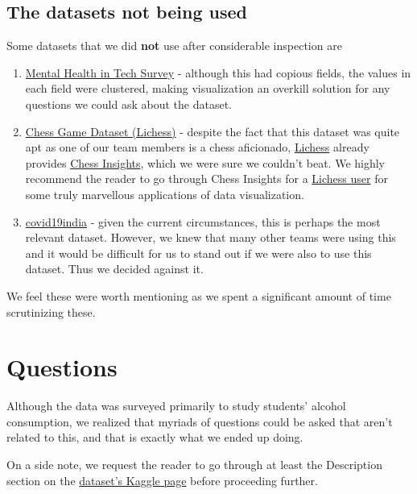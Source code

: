 \documentclass[titlepage, 12pt]{article}
\begin{document}
\subsection{The datasets not being used}
Some datasets that we did \textbf{not} use after considerable inspection are
\begin{enumerate}

    \item\href{https://www.kaggle.com/osmi/mental-health-in-tech-survey}{Mental
        Health in Tech Survey} - although this had copious fields, the values in
        each field were clustered, making visualization an overkill solution for
        any questions we could ask about the dataset.

    \item\href{https://www.kaggle.com/datasnaek/chess}{Chess Game Dataset
        (Lichess)} - despite the fact that this dataset was quite apt as one of
        our team members is a chess aficionado,
        \href{https://lichess.org/}{Lichess} already provides
        \href{https://lichess.org/blog/VmZbaigAABACtXQC/chess-insights}{Chess
        Insights}, which we were sure we couldn't beat. We highly recommend the
        reader to go through Chess Insights for a
        \href{https://lichess.org/insights/The_Mockingbird/acpl/variant}{Lichess
        user} for some truly marvellous applications of data visualization.

    \item\href{https://github.com/covid19india/api}{covid19india} - given the
        current circumstances, this is perhaps the most relevant dataset.
        However, we knew that many other teams were using this and it would be
        difficult for us to stand out if we were also to use this dataset. Thus
        we decided against it.

\end{enumerate}
We feel these were worth mentioning as we spent a significant amount of time
scrutinizing these.

\section{Questions}
Although the data was surveyed primarily to study students' alcohol consumption,
we realized that myriads of questions could be asked that aren't related to
this, and that is exactly what we ended up doing.

On a side note, we request the reader to go through at least the Description
section on the
\href{https://www.kaggle.com/uciml/student-alcohol-consumption}{dataset's Kaggle
page} before proceeding further.
\end{document}
